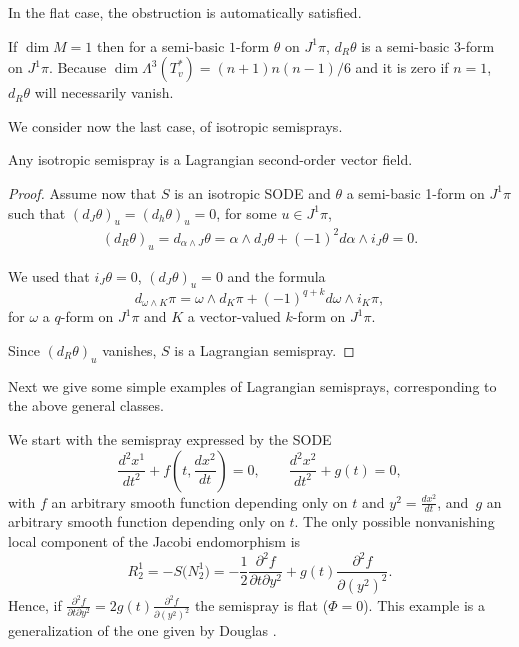 \documentclass[pdftex]{sigma}
\begin{document}
In the f\/lat case, the obstruction is automatically satisf\/ied.

If $\dim M=1$ then for a semi-basic $1$-form $\theta$ on $J^{1}\pi$,
$d_{R}\theta$ is a semi-basic $3$-form on $J^{1}\pi$. Because $\dim\Lambda^{3}\left(T_{v}^{*}\right)=(n+1)n(n-1)/6$
and it is zero if $n=1$, $d_{R}\theta$ will necessarily vanish.


We consider now the last case, of isotropic semisprays.

\begin{proposition}
Any isotropic semispray is a Lagrangian second-order vector field.
\end{proposition}

\begin{proof}
Assume now that $S$ is an isotropic SODE and $\theta$ a semi-basic
1-form on $J^{1}\pi$ such that $\left(d_{J}\theta\right)_{u}=\left(d_{h}\theta\right)_{u}=0$,
for some $u\in J^{1}\pi$, \begin{gather*}
\left(d_{R}\theta\right)_{u}   =   d_{\alpha\wedge J}\theta=\alpha\wedge d_{J}\theta+(-1)^{2}d\alpha\wedge i_{J}\theta=0.
\end{gather*}


We used that $i_{J}\theta=0$, $\left(d_{J}\theta\right)_{u}=0$ and
the formula~\cite{grifone00}
\[
d_{\omega\wedge K}\pi=\omega\wedge d_{K}\pi+(-1)^{q+k}d\omega\wedge i_{K}\pi,
\]
 for $\omega$ a $q$-form on $J^{1}\pi$ and $K$ a vector-valued
$k$-form on $J^{1}\pi$.

Since $\left(d_{R}\theta\right)_{u}$ vanishes, $S$ is a Lagrangian
semispray.
\end{proof}



Next we give some simple examples of Lagrangian semisprays, corresponding
to the above general classes.

We start with the semispray expressed by the SODE
\[
\frac{d^{2}x^{1}}{dt^{2}}+f\left(t,\frac{dx^{2}}{dt}\right)   =0,\qquad
\frac{d^{2}x^{2}}{dt^{2}}+g(t)   =0, \]
with $f$ an arbitrary smooth function depending only on $t$ and
$y^{2}=\frac{dx^{2}}{dt}$, and~$g$ an arbitrary smooth function
depending only on $t$. The only possible nonvanishing local component
of the Jacobi endomorphism is
\[
R_{2}^{1}=-S\big(N_{2}^{1}\big)=-\frac{1}{2}\frac{\partial^{2}f}{\partial t\partial y^{2}}+g(t)\frac{\partial^{2}f}{\partial(y^{2})^{2}}.
\]
Hence, if $\frac{\partial^{2}f}{\partial t\partial y^{2}}=2g(t)\frac{\partial^{2}f}{\partial(y^{2})^{2}}$
the semispray is f\/lat ($\Phi=0$). This example is a generalization
of the one given by Douglas \cite[(8.14)]{douglas41}.
\end{document}
